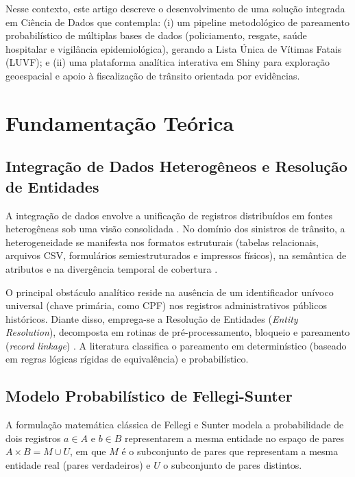 \documentclass[sigconf, nonacm, screen, language=portuguese, language=spanish, language={main=english}]{acmart}
\begin{document}
Nesse contexto, este artigo descreve o desenvolvimento de uma solução integrada em Ciência de Dados que contempla: (i) um pipeline metodológico de pareamento probabilístico de múltiplas bases de dados (policiamento, resgate, saúde hospitalar e vigilância epidemiológica), gerando a Lista Única de Vítimas Fatais (LUVF); e (ii) uma plataforma analítica interativa em Shiny para exploração geoespacial e apoio à fiscalização de trânsito orientada por evidências.

\section{Fundamentação Teórica}\label{sec:fundamentacao}

\subsection{Integração de Dados Heterogêneos e Resolução de Entidades}
A integração de dados envolve a unificação de registros distribuídos em fontes heterogêneas sob uma visão consolidada \cite{lenzerini2002, doan2012}. No domínio dos sinistros de trânsito, a heterogeneidade se manifesta nos formatos estruturais (tabelas relacionais, arquivos CSV, formulários semiestruturados e impressos físicos), na semântica de atributos e na divergência temporal de cobertura \cite{batini2016}.

O principal obstáculo analítico reside na ausência de um identificador unívoco universal (chave primária, como CPF) nos registros administrativos públicos históricos. Diante disso, emprega-se a Resolução de Entidades (\textit{Entity Resolution}), decomposta em rotinas de pré-processamento, bloqueio e pareamento (\textit{record linkage}) \cite{christen2012}. A literatura classifica o pareamento em determinístico (baseado em regras lógicas rígidas de equivalência) e probabilístico.

\subsection{Modelo Probabilístico de Fellegi-Sunter}
A formulação matemática clássica de Fellegi e Sunter \cite{fellegi1969} modela a probabilidade de dois registros $a \in A$ e $b \in B$ representarem a mesma entidade no espaço de pares $A \times B = M \cup U$, em que $M$ é o subconjunto de pares que representam a mesma entidade real (pares verdadeiros) e $U$ o subconjunto de pares distintos.
\end{document}
